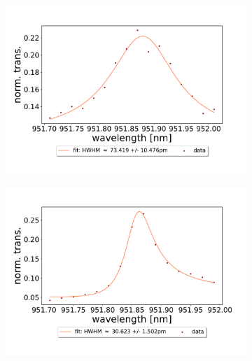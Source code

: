 \begin{figure}[h!]
    \centering
    \begin{subfigure}[b]{0.49\textwidth}
        \centering
        \includegraphics[width=\textwidth]{figures/results/double fano fits/30um_M3:M5_fit_4.pdf}
        \caption{}
        \label{fig:short_double_fano_trans}
    \end{subfigure}
    \begin{subfigure}[b]{0.49\textwidth}
        \centering
        \includegraphics[width=\textwidth]{figures/results/double fano fits/550um_M3:M5_fit_1.pdf}
        \caption{}
        \label{fig:long_double_fano_trans}
    \end{subfigure}
\end{figure}

